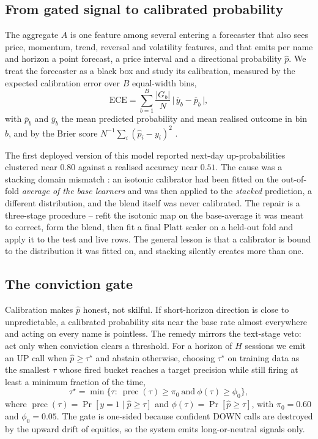 \subsection{From gated signal to calibrated probability}\label{sec:calib}

The aggregate $A$ is one feature among several entering a forecaster that also
sees price, momentum, trend, reversal and volatility features, and that emits per
name and horizon a point forecast, a price interval and a directional probability
$\hat p$. We treat the forecaster as a black box and study its calibration,
measured by the expected calibration error over $B$ equal-width bins,
\begin{equation}\label{eq:ece}
\mathrm{ECE}=\sum_{b=1}^{B}\frac{|G_b|}{N}\,
\bigl|\,\overline{y}_b-\overline{p}_b\,\bigr|,
\end{equation}
with $\overline p_b$ and $\overline y_b$ the mean predicted probability and mean
realised outcome in bin $b$, and by the Brier score
$N^{-1}\sum_i(\hat p_i-y_i)^2$ \citep{brier1950}.

The first deployed version of this model reported next-day up-probabilities
clustered near $0.80$ against a realised accuracy near $0.51$. The cause was a
stacking domain mismatch \citep{wolpert1992}: an isotonic calibrator had been
fitted on the out-of-fold \emph{average of the base learners} and was then
applied to the \emph{stacked} prediction, a different distribution, and the blend
itself was never calibrated. The repair is a three-stage procedure -- refit the
isotonic map on the base-average it was meant to correct, form the blend, then
fit a final Platt scaler \citep{platt1999} on a held-out fold and apply it to the
test and live rows. The general lesson is that a calibrator is bound to the
distribution it was fitted on, and stacking silently creates more than one.

\subsection{The conviction gate}\label{sec:gate}

Calibration makes $\hat p$ honest, not skilful. If short-horizon direction is
close to unpredictable, a calibrated probability sits near the base rate almost
everywhere and acting on every name is pointless. The remedy mirrors the
text-stage veto: act only when conviction clears a threshold. For a horizon of
$H$ sessions we emit an UP call when $\hat p\ge\tau^\star$ and abstain otherwise,
choosing $\tau^\star$ on training data as the smallest $\tau$ whose fired bucket
reaches a target precision while still firing at least a minimum fraction of the
time,
\begin{equation}\label{eq:tau}
\tau^\star=\min\bigl\{\tau:\ \operatorname{prec}(\tau)\ge \pi_0
\ \text{and}\ \phi(\tau)\ge\phi_0\bigr\},
\end{equation}
where $\operatorname{prec}(\tau)=\Pr[y=1\mid\hat p\ge\tau]$ and
$\phi(\tau)=\Pr[\hat p\ge\tau]$, with $\pi_0=0.60$ and $\phi_0=0.05$. The gate is
one-sided because confident DOWN calls are destroyed by the upward drift of
equities, so the system emits long-or-neutral signals only.

